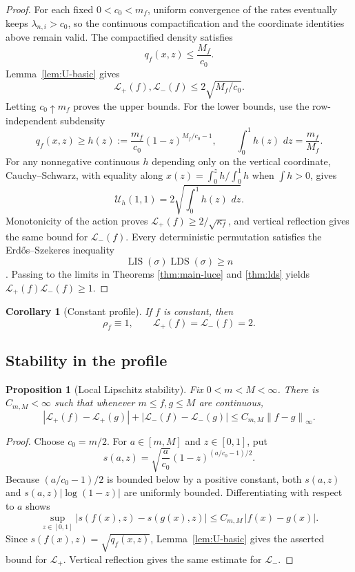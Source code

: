 \documentclass[11pt]{article}
\newtheorem{proposition}[theorem]{Proposition}
\newtheorem{corollary}[theorem]{Corollary}
\theoremstyle{remark}
\newcommand{\LIS}{\operatorname{LIS}}
\newcommand{\LDS}{\operatorname{LDS}}
\newcommand{\dd}{\,d}
\newcommand{\calL}{\mathcal L}
\newcommand{\calU}{\mathcal U}
\newcommand{\norm}[1]{\left\lVert #1\right\rVert}
\begin{document}
\begin{proof}
For each fixed $0<c_0<m_f$, uniform convergence of the rates eventually
keeps $\lambda_{n,i}>c_0$, so the continuous compactification and the coordinate
identities above remain valid.  The compactified density satisfies
\[
        q_f(x,z)\le\frac{M_f}{c_0}.
\]
Lemma~\ref{lem:U-basic} gives
\[
        \calL_+(f),\calL_-(f)
        \le2\sqrt{M_f/c_0}.
\]
Letting $c_0\uparrow m_f$ proves the upper bounds.  For the lower bounds, use
the row-independent subdensity
\[
 q_f(x,z)\ge h(z):=\frac{m_f}{c_0}(1-z)^{M_f/c_0-1},
 \qquad
 \int_0^1h(z)\,\dd z=\frac{m_f}{M_f}.
\]
For any nonnegative continuous $h$ depending only on the vertical coordinate,
Cauchy--Schwarz, with equality along
$x(z)=\int_0^z h/\int_0^1h$ when $\int h>0$, gives
\[
        \calU_h(1,1)=2\sqrt{\int_0^1h(z)\,\dd z}.
\]
Monotonicity of the action proves $\calL_+(f)\ge2/\sqrt{\kappa_f}$, and
vertical reflection gives the same bound for $\calL_-(f)$.
Every deterministic
permutation satisfies the Erd\H{o}s--Szekeres inequality
\[
        \LIS(\sigma)\LDS(\sigma)\ge n
\]
\cite{ErdosSzekeres1935}.  Passing to the limits in Theorems
\ref{thm:main-luce} and \ref{thm:lds} yields
$\calL_+(f)\calL_-(f)\ge1$.
\end{proof}

\begin{corollary}[Constant profile]\label{cor:constant-profile}
If $f$ is constant, then
\[
        \rho_f\equiv1,
        \qquad
        \calL_+(f)=\calL_-(f)=2.
\]
\end{corollary}

\subsection{Stability in the profile}

\begin{proposition}[Local Lipschitz stability]\label{prop:profile-stability}
Fix $0<m<M<\infty$.  There is $C_{m,M}<\infty$ such that whenever
$m\le f,g\le M$ are continuous,
\begin{equation}\label{eq:profile-stability}
        |\calL_+(f)-\calL_+(g)|
        +|\calL_-(f)-\calL_-(g)|
        \le C_{m,M}\norm{f-g}_\infty.
\end{equation}
\end{proposition}

\begin{proof}
Choose $c_0=m/2$.  For $a\in[m,M]$ and $z\in[0,1]$, put
\[
 s(a,z)=\sqrt{\frac{a}{c_0}}
        (1-z)^{(a/c_0-1)/2}.
\]
Because $(a/c_0-1)/2$ is bounded below by a positive constant, both
$s(a,z)$ and $s(a,z)|\log(1-z)|$ are uniformly bounded.  Differentiating with
respect to $a$ shows
\[
        \sup_{z\in[0,1]}
        |s(f(x),z)-s(g(x),z)|
        \le C_{m,M}\,|f(x)-g(x)|.
\]
Since $s(f(x),z)=\sqrt{q_f(x,z)}$, Lemma~\ref{lem:U-basic} gives the asserted
bound for $\calL_+$.  Vertical reflection gives the same estimate for
$\calL_-$.
\end{proof}
\end{document}
